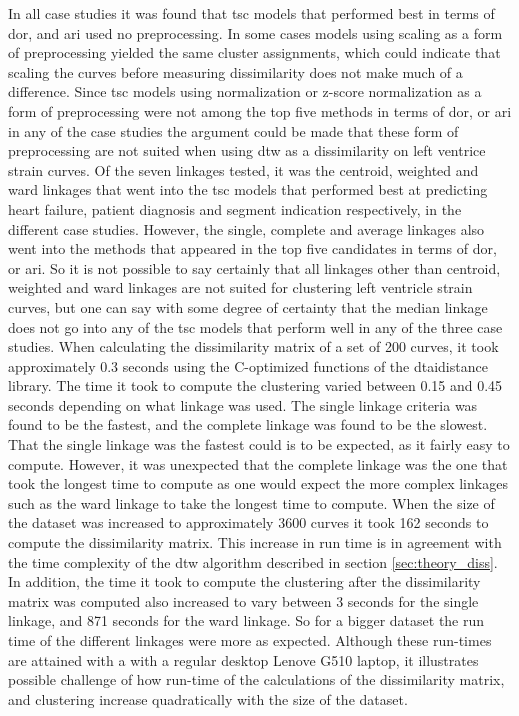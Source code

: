 In all case studies it was found that \acrshort{tsc} models that performed best in terms of \acrshort{dor}, and \acrshort{ari} used no preprocessing. In some cases models using scaling as a form of preprocessing yielded the same cluster assignments, which could indicate that scaling the curves before measuring dissimilarity does not make much of a difference. Since \acrshort{tsc} models using normalization or z-score normalization as a form of preprocessing were not among the top five methods in terms of \acrshort{dor}, or \acrshort{ari} in any of the case studies the argument could be made that these form of preprocessing are not suited when using \acrshort{dtw} as a dissimilarity on left ventrice strain curves. \bigskip
Of the seven linkages tested, it was the centroid, weighted and ward linkages that went into the \acrshort{tsc} models that performed best at predicting heart failure, patient diagnosis and segment indication respectively, in the different case studies. However, the single, complete and average linkages also went into the methods that appeared in the top five candidates in terms of \acrshort{dor}, or \acrshort{ari}. So it is not possible to say certainly that all linkages other than centroid, weighted and ward linkages are not suited for clustering left ventricle strain curves, but one can say with some degree of certainty that the median linkage does not go into any of the \acrshort{tsc} models that perform well in any of the three case studies. \bigskip
When calculating the dissimilarity matrix of a set of 200 curves, it took approximately 0.3 seconds using the C-optimized functions of the dtaidistance library. The time it took to compute the clustering varied between 0.15 and 0.45 seconds depending on what linkage was used. The single linkage criteria was found to be the fastest, and the complete linkage was found to be the slowest. That the single linkage was the fastest could is to be expected, as it fairly easy to compute. However, it was unexpected that the complete linkage was the one that took the longest time to compute as one would expect the more complex linkages such as the ward linkage to take the longest time to compute. When the size of the dataset was increased to approximately 3600 curves it took 162 seconds to compute the dissimilarity matrix. This increase in run time is in agreement with the time complexity of the \acrshort{dtw} algorithm described in section \ref{sec:theory_diss}. In addition, the time it took to compute the clustering after the dissimilarity matrix was computed also increased to vary between 3 seconds for the single linkage, and 871 seconds for the ward linkage. So for a bigger dataset the run time of the different linkages were more as expected. Although these run-times are attained with a with a regular desktop Lenove G510 laptop, it illustrates possible challenge of how run-time of the calculations of the dissimilarity matrix, and clustering increase quadratically with the size of the dataset. \bigskip
